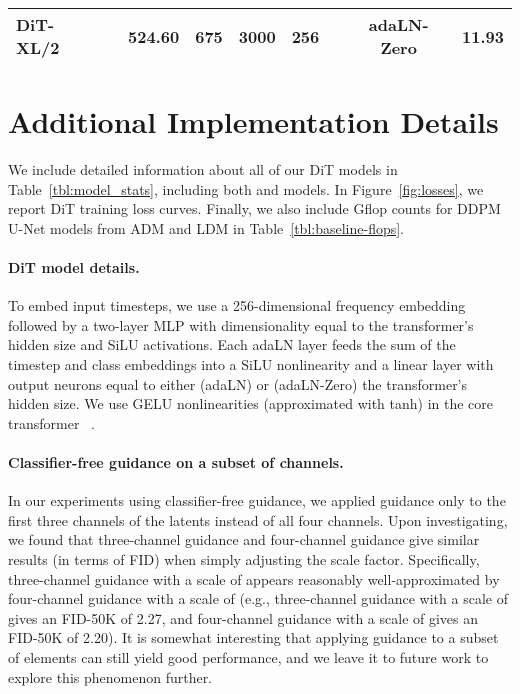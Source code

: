 \documentclass[10pt,twocolumn,letterpaper]{article}
\begin{document}
\begin{table*}
{\begin{tabular}{l c c c c c c c c}
DiT-XL/2 &      &      524.60     &   675  &  3000&  256 &  & adaLN-Zero & 11.93 \\
\bottomrule
\end{tabular}}
\caption{\textbf{Details of all DiT models.} We report detailed information about every DiT model in our paper. Note that FID-50K here is computed \textit{without} classifier-free guidance. Parameter and flop counts exclude the VAE model which contains 84M parameters across the encoder and decoder. For both the  and  DiT-XL/2 models, we never observed FID saturate and continued training them as long as possible. Numbers reported in this table use the ft-MSE VAE decoder.}
\label{tbl:model_stats}
\end{table*}

\section{Additional Implementation Details}
We include detailed information about all of our DiT models in Table~\ref{tbl:model_stats}, including both  and  models. In Figure~\ref{fig:losses}, we report DiT training loss curves. Finally, we also include Gflop counts for DDPM U-Net models from ADM and LDM in Table~\ref{tbl:baseline-flops}.
\vspace{-3mm}
\paragraph{DiT model details.} To embed input timesteps, we use a 256-dimensional frequency embedding~\cite{dhariwal2021adm} followed by a two-layer MLP with dimensionality equal to the transformer's hidden size and SiLU activations. Each adaLN layer feeds the sum of the timestep and class embeddings into a SiLU nonlinearity and a linear layer with output neurons equal to either  (adaLN) or  (adaLN-Zero) the transformer's hidden size. We use GELU nonlinearities (approximated with tanh) in the core transformer ~\cite{hendrycks2016gaussian}.
\vspace{-3mm}
\paragraph{Classifier-free guidance on a subset of channels.} In our experiments using classifier-free guidance, we applied guidance only to the first three channels of the latents instead of all four channels. Upon investigating, we found that three-channel guidance and four-channel guidance give similar results (in terms of FID) when simply adjusting the scale factor. Specifically, three-channel guidance with a scale of  appears reasonably well-approximated by four-channel guidance with a scale of  (e.g., three-channel guidance with a scale of  gives an FID-50K of 2.27, and four-channel guidance with a scale of  gives an FID-50K of 2.20). It is somewhat interesting that applying guidance to a subset of elements can still yield good performance, and we leave it to future work to explore this phenomenon further.
\end{document}
